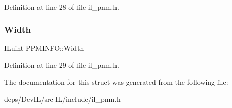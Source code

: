 Definition at line 28 of file il\+\_\+pnm.\+h.

\mbox{\label{structPPMINFO_a92882716fcd68eb87ff42aa680384507}} 
\subsubsection{\texorpdfstring{Width}{Width}}
{\footnotesize\ttfamily I\+Luint P\+P\+M\+I\+N\+F\+O\+::\+Width}



Definition at line 29 of file il\+\_\+pnm.\+h.



The documentation for this struct was generated from the following file\+:\begin{DoxyCompactItemize}
\item 
deps/\+Dev\+I\+L/src-\/\+I\+L/include/il\+\_\+pnm.\+h\end{DoxyCompactItemize}
